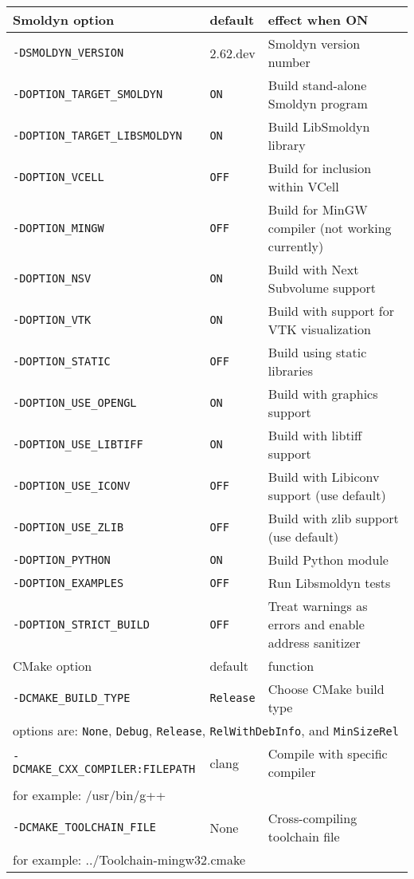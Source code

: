 \documentclass {book}
\newcommand {\ttt} {\texttt}
\begin{document}
\begin{longtable}[c]{lll}
Smoldyn option & default & effect when ON\\
\hline
\ttt{-DSMOLDYN\_VERSION} & 2.62.dev & Smoldyn version number\\
\ttt{-DOPTION\_TARGET\_SMOLDYN} & \ttt{ON} & Build stand-alone Smoldyn program\\
\ttt{-DOPTION\_TARGET\_LIBSMOLDYN} & \ttt{ON} & Build LibSmoldyn library\\
\ttt{-DOPTION\_VCELL} & \ttt{OFF} & Build for inclusion within VCell\\
\ttt{-DOPTION\_MINGW} & \ttt{OFF} & Build for MinGW compiler (not working currently)\\
\ttt{-DOPTION\_NSV} & \ttt{ON} & Build with Next Subvolume support\\
\ttt{-DOPTION\_VTK} & \ttt{ON} & Build with support for VTK visualization\\
\ttt{-DOPTION\_STATIC} & \ttt{OFF} & Build using static libraries\\
\ttt{-DOPTION\_USE\_OPENGL} & \ttt{ON} & Build with graphics support\\
\ttt{-DOPTION\_USE\_LIBTIFF} & \ttt{ON} & Build with libtiff support\\
\ttt{-DOPTION\_USE\_ICONV} & \ttt{OFF} & Build with Libiconv support (use default)\\
\ttt{-DOPTION\_USE\_ZLIB} & \ttt{OFF} & Build with zlib support (use default)\\
\ttt{-DOPTION\_PYTHON} & \ttt{ON} & Build Python module\\
\ttt{-DOPTION\_EXAMPLES} & \ttt{OFF} & Run Libsmoldyn tests\\
\ttt{-DOPTION\_STRICT\_BUILD} & \ttt{OFF} & Treat warnings as errors and enable address sanitizer\\
\hline
CMake option & default & function\\
\hline
\ttt{-DCMAKE\_BUILD\_TYPE} & \ttt{Release} & Choose CMake build type\\
\multicolumn{3}{l}{\hspace{0.3in}options are: \ttt{None}, \ttt{Debug}, \ttt{Release}, \ttt{RelWithDebInfo}, and \ttt{MinSizeRel}}\\
\ttt{-DCMAKE\_CXX\_COMPILER:FILEPATH} & clang & Compile with specific compiler\\
\multicolumn{3}{l}{\hspace{0.3in}for example: /usr/bin/g++}\\
\ttt{-DCMAKE\_TOOLCHAIN\_FILE} & None & Cross-compiling toolchain file \\
\multicolumn{3}{l}{\hspace{0.3in}for example: ../Toolchain-mingw32.cmake}\\
\end{longtable}
\end{document}
